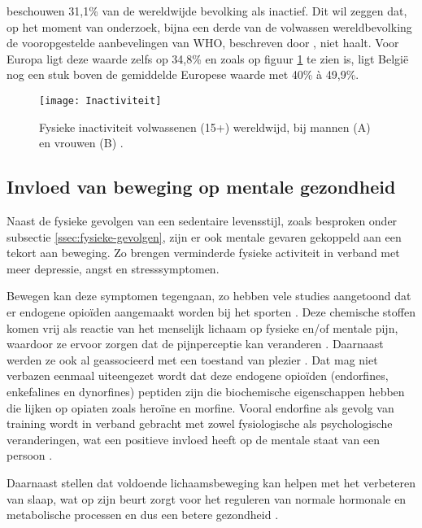 \textcite{Hallal2012} beschouwen 31,1\% van de wereldwijde bevolking als inactief. Dit wil zeggen dat, op het moment van onderzoek, bijna een derde van de volwassen wereldbevolking de vooropgestelde aanbevelingen van WHO, beschreven door \textcite{Bull2020}, niet haalt. Voor Europa ligt deze waarde zelfs op 34,8\% en zoals op figuur \ref{fig:inactivity} te zien is, ligt België nog een stuk boven de gemiddelde Europese waarde met 40\% à 49,9\%.

\begin{figure}[h]
    \caption[Fysieke inactiviteit bij volwassenen wereldwijd]{Fysieke inactiviteit volwassenen (15+) wereldwijd, bij mannen (A) en vrouwen (B) \autocite{Bull2020}.}
    \texttt{[image: Inactiviteit]}
    \label{fig:inactivity}
\end{figure}

\subsection{Invloed van beweging op mentale gezondheid}
Naast de fysieke gevolgen van een sedentaire levensstijl, zoals besproken onder subsectie \ref{ssec:fysieke-gevolgen}, zijn er ook mentale gevaren gekoppeld aan een tekort aan beweging. Zo brengen \textcite{Stanton2020} verminderde fysieke activiteit in verband met meer depressie, angst en stresssymptomen.

Bewegen kan deze symptomen tegengaan, zo hebben vele studies aangetoond dat er endogene opioïden aangemaakt worden bij het sporten \autocite{Harber1984}. Deze chemische stoffen komen vrij als reactie van het menselijk lichaam op fysieke en/of mentale pijn, waardoor ze ervoor zorgen dat de pijnperceptie kan veranderen \autocite{Chaudhry2023, Dishman2009}. Daarnaast werden ze ook al geassocieerd met een toestand van plezier \autocite{Chaudhry2023}.
Dat mag niet verbazen eenmaal uiteengezet wordt dat deze endogene opioïden (endorfines, enkefalines en dynorfines) peptiden zijn die biochemische eigenschappen hebben die lijken op opiaten zoals heroïne en morfine. Vooral endorfine als gevolg van training wordt in verband gebracht met zowel fysiologische als psychologische veranderingen, wat een positieve invloed heeft op de mentale staat van een persoon \autocite{Dishman2009}.

Daarnaast stellen \textcite{Mahindru2023} dat voldoende lichaamsbeweging kan helpen met het verbeteren van slaap, wat op zijn beurt zorgt voor het reguleren van normale hormonale en metabolische processen en dus een betere gezondheid \autocite{Dolezal2017}.

